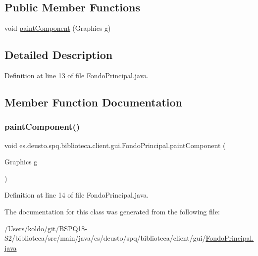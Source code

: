 \subsection*{Public Member Functions}
\begin{DoxyCompactItemize}
\item 
void \mbox{\hyperlink{classes_1_1deusto_1_1spq_1_1biblioteca_1_1client_1_1gui_1_1_fondo_principal_a16482941853688017e6315d733af0982}{paint\+Component}} (Graphics g)
\end{DoxyCompactItemize}


\subsection{Detailed Description}


Definition at line 13 of file Fondo\+Principal.\+java.



\subsection{Member Function Documentation}
\mbox{\label{classes_1_1deusto_1_1spq_1_1biblioteca_1_1client_1_1gui_1_1_fondo_principal_a16482941853688017e6315d733af0982}} 
\subsubsection{\texorpdfstring{paint\+Component()}{paintComponent()}}
{\footnotesize\ttfamily void es.\+deusto.\+spq.\+biblioteca.\+client.\+gui.\+Fondo\+Principal.\+paint\+Component (\begin{DoxyParamCaption}\item[{Graphics}]{g }\end{DoxyParamCaption})}



Definition at line 14 of file Fondo\+Principal.\+java.



The documentation for this class was generated from the following file\+:\begin{DoxyCompactItemize}
\item 
/\+Users/koldo/git/\+B\+S\+P\+Q18-\/\+S2/biblioteca/src/main/java/es/deusto/spq/biblioteca/client/gui/\mbox{\hyperlink{_fondo_principal_8java}{Fondo\+Principal.\+java}}\end{DoxyCompactItemize}
